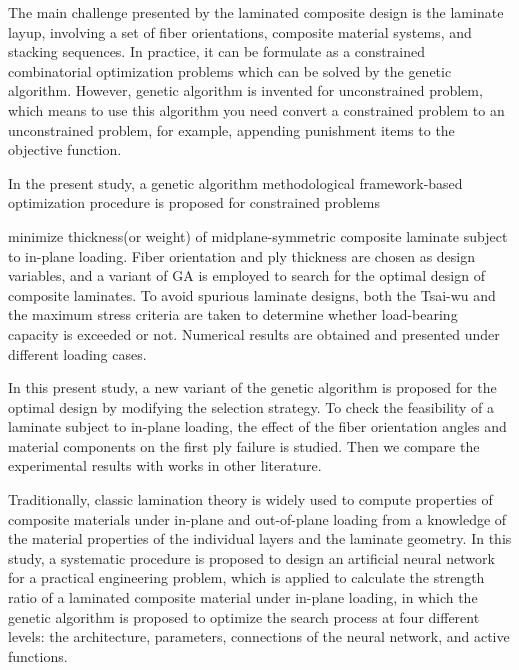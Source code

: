 The main challenge presented by the laminated composite design is the laminate
layup, involving a set of fiber orientations, composite material systems, and
stacking sequences. In practice, it can be formulate as a constrained
combinatorial optimization problems which can be solved by the genetic
algorithm. However, genetic algorithm is invented for unconstrained problem,
which means to use this algorithm you need convert a constrained problem to an
unconstrained problem, for example, appending punishment items to the objective
function. 

In the present study,  a genetic algorithm methodological framework-based
optimization procedure is proposed for constrained problems 

minimize thickness(or weight) of
midplane-symmetric composite laminate subject to in-plane loading. Fiber
orientation and ply thickness are chosen as design variables, and a variant of GA is 
employed to search for the optimal design of composite laminates.  To avoid
spurious laminate designs, both the Tsai-wu and the maximum stress criteria are
taken to determine whether load-bearing capacity is exceeded or not. Numerical
results are obtained and presented under different loading cases.


In this present study, a new variant of
the genetic algorithm is proposed for the optimal design by modifying the
selection strategy.
To check the feasibility of a laminate subject to in-plane
loading, the effect of the fiber orientation angles and material components on
the first ply failure is studied. Then we compare the experimental results with
works in other literature.

Traditionally, classic lamination theory is widely used to compute
properties of composite materials under in-plane and out-of-plane loading from
a knowledge of the material properties of the individual layers and the
laminate geometry. In this study, a systematic procedure is proposed to design
an artificial neural network for a practical engineering problem, which is
applied to calculate the strength ratio of a laminated composite material under
in-plane loading, in which the genetic algorithm is proposed to optimize the search
process at four different levels: the architecture, parameters, connections of
the neural network, and active functions. 

